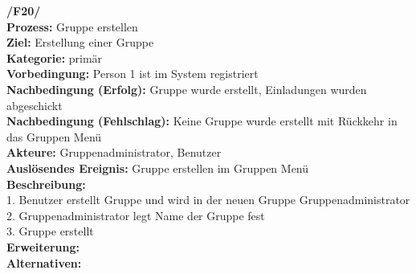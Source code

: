 \textbf{/F20/} \\
\textbf{Prozess:} Gruppe erstellen\\
\textbf{Ziel:} Erstellung einer Gruppe\\
\textbf{Kategorie:} primär \\
\textbf{Vorbedingung:} Person 1 ist im System registriert\\
\textbf{Nachbedingung (Erfolg):} Gruppe wurde erstellt, Einladungen wurden abgeschickt\\
\textbf{Nachbedingung (Fehlschlag):} Keine Gruppe wurde erstellt mit Rückkehr in das Gruppen Menü\\
\textbf{Akteure:} Gruppenadministrator, Benutzer \\
\textbf{Auslösendes Ereignis:} Gruppe erstellen im Gruppen Menü\\
\textbf{Beschreibung:} \\
1. Benutzer erstellt Gruppe und wird in der neuen Gruppe Gruppenadministrator\\
2. Gruppenadministrator legt Name der Gruppe fest\\
3. Gruppe erstellt\\
\textbf{Erweiterung:} \\
\textbf{Alternativen:} \\